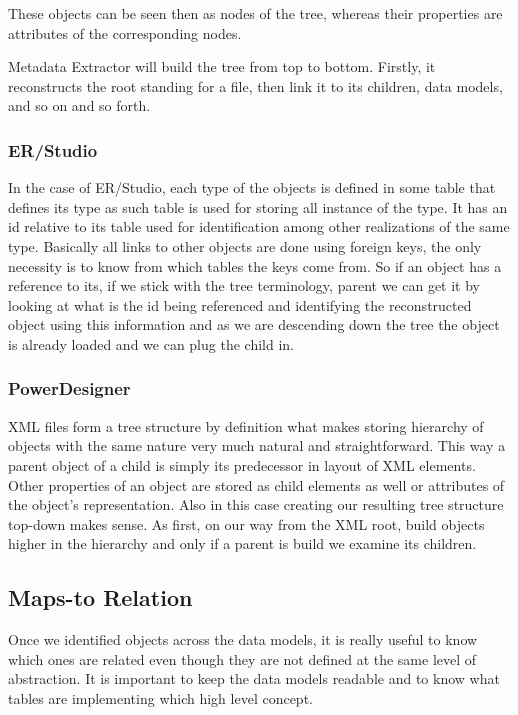  These objects can be seen then as nodes of the tree, whereas their properties are attributes of the corresponding nodes.
 
Metadata Extractor will build the tree from top to bottom. Firstly, it reconstructs the root standing for a file, then link it to its children, data models, and so on and so forth.

\subsubsection{ER/Studio}

In the case of ER/Studio, each type of the objects is defined in some table that defines its type as such table is used for storing all instance of the type. It has an id relative to its table used for identification among other realizations of the same type. Basically all links to other objects are done using foreign keys, the only necessity is to know from which tables the keys come from. 
So if an object has a reference to its, if we stick with the tree terminology, parent we can get it by looking at what is the id being referenced and identifying the reconstructed object using this information and as we are descending down the tree the object is already loaded and we can plug the child in.

\subsubsection{PowerDesigner}

XML files form a tree structure by definition what makes storing hierarchy of objects with the same nature very much natural and straightforward. 
This way a parent object of a child is simply its predecessor in layout of XML elements. 
Other properties of an object are stored as child elements as well or attributes of the object's representation. 
Also in this case creating our resulting tree structure top-down makes sense. As first, on our way from the XML root, build objects higher in the hierarchy and only if a parent is build we examine its children.


\subsection{Maps-to Relation}
\label{maps_to_analysis}

Once we identified objects across the data models, it is really useful to know which ones are related even though they are not defined at the same level of abstraction. It is important to keep the data models readable and to know what tables are implementing which high level concept.

